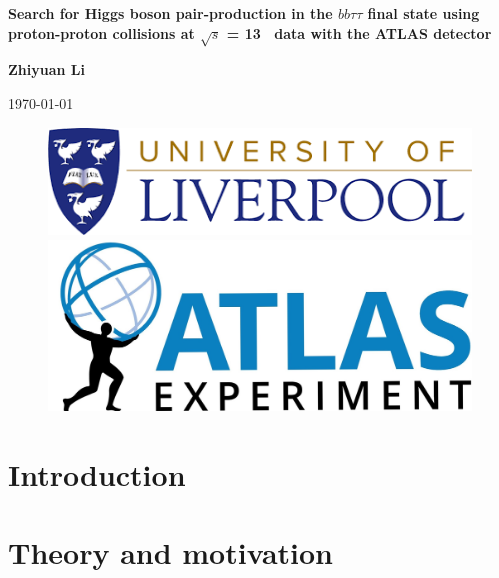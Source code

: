 \documentclass[twoside,11pt]{report}
\newcommand{\changefont}{\fontsize{9}{11}\selectfont}
\newcommand{\changefontbig}{\fontsize{12}{14}\selectfont}
\begin{document}
\fancyhead{}
\begin{titlepage}
	\centering
	{\LARGE \textbf{Search for Higgs boson pair-production in the $bb\tau\tau$ final state using proton-proton collisions at $\sqrt{s}$ = 13 \TeV\ data with the ATLAS detector} \par}
	\vspace{1cm}
	{\LARGE \textbf{Zhiyuan Li} \par}
	\vspace{0.2cm}
	\today
	\vspace{3cm}
	\begin{figure}[htp]
		\centering
		\includegraphics[width=.5\textwidth]{logo.png}
		\vspace{3em}
		\centering
		\includegraphics[width=.45\textwidth]{ATLAS-Logo-Ref-RGB-H_1.jpg}
		\end{figure}
\end{titlepage}

\tableofcontents{}
\printindex{}

\newpage
{}
\fancyhead[RE]{\changefont \rightmark}
\fancyhead[LO]{\changefontbig \textbf{\chaptername . \thechapter}}
\large
\raggedbottom
\chapter{Introduction}
\chapter{Theory and motivation}

\end{document}
